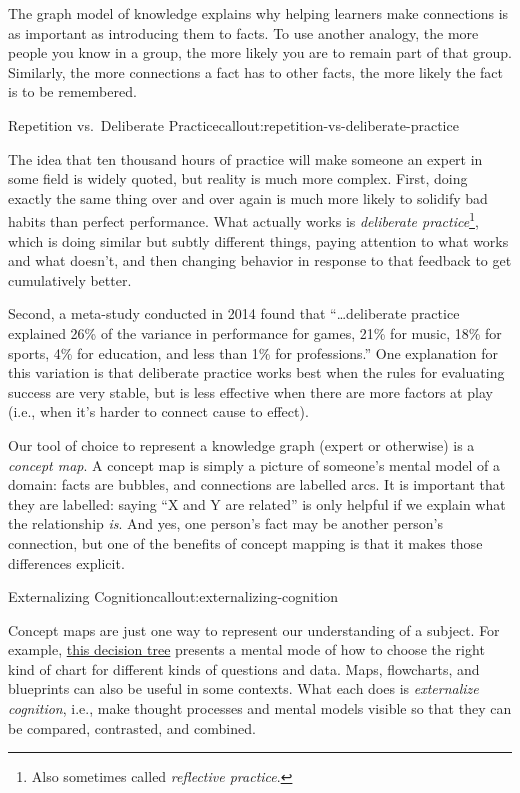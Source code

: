 The graph model of knowledge explains why helping learners make
connections is as important as introducing them to facts.  To use
another analogy, the more people you know in a group, the more likely
you are to remain part of that group.  Similarly, the more connections
a fact has to other facts, the more likely the fact is to be
remembered.

\begin{callout}{Repetition vs.\ Deliberate Practice}{callout:repetition-vs-deliberate-practice}

The idea that ten thousand hours of practice will make someone an
expert in some field is widely quoted, but reality is much more
complex. First, doing exactly the same thing over and over again is
much more likely to solidify bad habits than perfect performance.
What actually works is \emph{deliberate practice}\footnote{Also
sometimes called \emph{reflective practice}.}, which is doing similar
but subtly different things, paying attention to what works and what
doesn't, and then changing behavior in response to that feedback to
get cumulatively better.

Second, a meta-study conducted in 2014 \cite{bib:macnamara-deliberate}
found that ``{\ldots}deliberate practice explained 26\% of the
variance in performance for games, 21\% for music, 18\% for sports,
4\% for education, and less than 1\% for professions.'' One
explanation for this variation is that deliberate practice works best
when the rules for evaluating success are very stable, but is less
effective when there are more factors at play (i.e., when it's harder
to connect cause to effect).

\end{callout}


Our tool of choice to represent a knowledge graph (expert or
otherwise) is a \emph{concept map}.  A concept map is simply a picture
of someone's mental model of a domain: facts are bubbles, and
connections are labelled arcs. It is important that they are labelled:
saying ``X and Y are related'' is only helpful if we explain what the
relationship \emph{is}. And yes, one person's fact may be another
person's connection, but one of the benefits of concept mapping is
that it makes those differences explicit.

\begin{callout}{Externalizing Cognition}{callout:externalizing-cognition}

Concept maps are just one way to represent our understanding of a
subject.  For example, \href{fixme-abela}{this decision tree} presents
a mental mode of how to choose the right kind of chart for different
kinds of questions and data.  Maps, flowcharts, and blueprints can
also be useful in some contexts.  What each does is \emph{externalize
cognition}, i.e., make thought processes and mental models visible so
that they can be compared, contrasted, and combined.

\end{callout}

